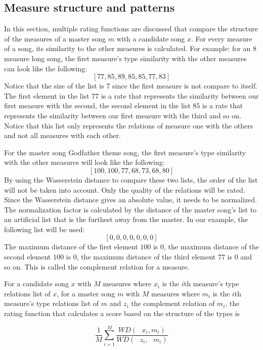 \subsection{Measure structure and patterns}
In this section, multiple rating functions are discussed that compare the  structure of the measures of a master song $m$ with a candidate song $x$. For every measure of a song, its similarity to the other measures is calculated.
For example: for an 8 measure long song, the first measure's type similarity with the other measures can look like the following:
\[[77, 85, 89, 85, 85, 77, 83]\]
Notice that the size of the list is 7 since the first measure is not compare to itself.  The first element in the list $77$ is a rate that represents the similarity between our first measure with the second, the second element in the list $85$ is a rate that represents the similarity between our first measure with the third and so on. Notice that this list only represents the relations of measure one with the others and not all measures with each other.

For the master song  Godfather theme song, the first measure's type similarity with the other measures will look like the following:
\[[100, 100, 77, 68, 73, 68, 80]\]
By using the Wasserstein distance to compare these two lists, the order of the list will not be taken into account. Only the quality of the relations will be rated. Since the Wasserstein distance gives an absolute value, it needs to be normalized. The normalization factor is calculated by the distance of the master song's list to an artificial list that is the furthest away from the master. In our example, the following list will be used:
\[[0, 0, 0, 0, 0, 0, 0]\]
The maximum distance of the first element $100$ is $0$, the maximum distance of the second element $100$ is $0$, the maximum distance of the third element $77$ is $0$ and so on. This is called the complement relation for a measure.

For a candidate song $x$ with $M$ measures where $x_{i}$ is the $i$th measure's type relations list of $x$, for a master song $m$ with $M$ measures where $m_{i}$ is the $i$th measure's type relations list of $m$ and $z_{i}$ the complement relation of $m_{i}$, the rating function that calculates a score based on the structure of the types is

\[  \frac{1}{M}\sum_{i=1}^{M} \frac{WD(\textit{ $x_i$},\textit{$m_i$})} {WD(\textit{ $z_i$},\textit{ $m_i$})} \]

